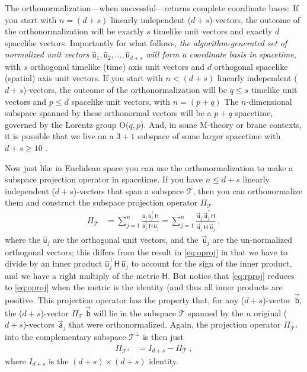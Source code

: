 \documentclass{article}
\newcommand{\metric}{\mathsf{H}}
\newcommand{\proj}{\mathsf{\Pi}}
\newcommand\upvec[1]{\!\vec{\,\mathrm{#1}}}
\newcommand{\Lvec}[1]{\upvec{\mathsf{#1}}} %
\newcommand{\Lhat}[1]{\hat{\mathsf{#1}}} %
\newcommand{\plus}{\!+\!} %
\begin{document}
The orthonormalization---when successful---returns complete coordinate bases:
If you start with $n=(d+s)$ linearly independent ($d\plus s$)-vectors, the outcome of the orthonormalization will be exactly $s$ timelike unit vectors and exactly $d$ spacelike vectors.
Importantly for what follows, \emph{the algorithm-generated set of normalized unit vectors $\Lhat{u}_1,\Lhat{u}_2,\ldots,\Lhat{u}_{d+s}$ will form a coordinate basis in spacetime}, with $s$ orthogonal timelike (time) axis unit vectors and $d$ orthogonal spacelike (spatial) axis unit vectors.
If you start with $n<(d+s)$ linearly independent ($d\plus s$)-vectors, the outcome of the orthonormalization will be $q\leq s$ timelike unit vectors and $p\leq d$ spacelike unit vectors, with $n=(p+q)$
The $n$-dimensional subspace spanned by these orthonormal vectors will be a $p\plus q$ spacetime, governed by the Lorentz group O($q,p$).
And, in some M-theory or brane contexts, it is possible that we live on a $3\plus 1$ subspace of some larger spacetime with $d+s\geq 10$ \cite{branes, strings}.

Now just like in Euclidean space you can use the orthonormalization to make a subspace projection operator in spacetime.
If you have $n\leq d+s$ linearly independent ($d\plus s$)-vectors that span a subspace $\mathscr{T}$, then you can orthonormalize them and construct the subspace projection operator $\proj_\mathscr{T}$
\begin{align}\label{eq:rproj}
    \proj_\mathscr{T} &= \sum_{j=1}^n \frac{\Lhat{u}_j\,\Lhat{u}_j^\top\metric}{\Lhat{u}_j^\top\metric\,\Lhat{u}_j} = \sum_{j=1}^n \frac{\Lvec{u}_j\,\Lvec{u}_j^\top\metric}{\Lvec{u}_j^\top\metric\,\Lvec{u}_j} ~,
\end{align}
where the $\Lhat{u}_j$ are the orthogonal unit vectors, and the $\Lvec{u}_j$ are the un-normalized orthogonal vectors; this differs from the result in \eqref{eq:oproj} in that we have to divide by an inner product $\Lhat{u}_j^\top\metric\,\Lhat{u}_j$ to account for the sign of the inner product, and we have a right multiply of the metric $\metric$.
But notice that \eqref{eq:rproj} reduces to \eqref{eq:oproj} when the metric is the identity (and thus all inner products are positive.
This projection operator has the property that, for any ($d\plus s$)-vector $\Lvec{b}$, the ($d\plus s$)-vector $\proj_\mathscr{T}\,\Lvec{b}$ will lie in the subspace $\mathscr{T}$ spanned by the $n$ original ($d\plus s$)-vectors $\Lvec{a}_j$ that were orthonormalized.
Again, the projection operator $\proj_{\mathscr{T}^\perp}$ into the complementary subspace $\mathscr{T}^\perp$ is then just
\begin{align}\label{eq:lprojcomp}
    \proj_{\mathscr{T}^\perp} &= I_{d+s} - \proj_\mathscr{T} ~,
\end{align}
where $I_{d+s}$ is the $(d+s)\times(d+s)$ identity.
\end{document}
